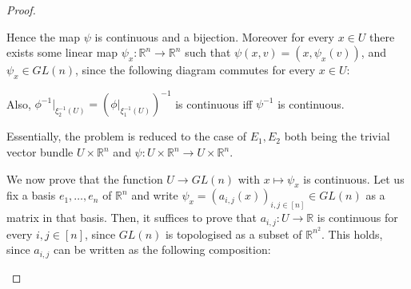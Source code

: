 \begin{proof}
\vspace*{-1em}
\begin{center}
\end{center}
Hence the map $\psi$ is continuous and a bijection. Moreover for every $x\in U$ there exists some linear map $\psi_x:\mathbb{R}^n\to\mathbb{R}^n$ such that $\psi(x,v)=(x,\psi_x(v))$, and $\psi_x\in GL(n)$, since the following diagram commutes for every $x\in U$:
\vspace*{-1em}
\begin{center}
\end{center}
Also, $\phi^{-1}|_{\xi_2^{-1}(U)}=(\phi|_{\xi_1^{-1}(U)})^{-1}$ is continuous iff $\psi^{-1}$ is continuous.

Essentially, the problem is reduced to the case of $E_1,E_2$ both being the trivial vector bundle $U\times\mathbb{R}^n$ and $\psi:U\times\mathbb{R}^n\to U\times\mathbb{R}^n$.

We now prove that the function $U\to GL(n)$ with $x\mapsto\psi_x$ is continuous. Let us fix a basis $e_1,\ldots,e_n$ of $\mathbb{R}^n$ and write $\psi_x=(a_{i,j}(x))_{i,j\in[n]}\in GL(n)$ as a matrix in that basis. Then, it suffices to prove that $a_{i,j}:U\to\mathbb{R}$ is continuous for every $i,j\in[n]$, since $GL(n)$ is topologised as a subset of $\mathbb{R}^{n^2}$. This holds, since $a_{i,j}$ can be written as the following composition:
\begin{center}
\end{center}


\end{proof}
